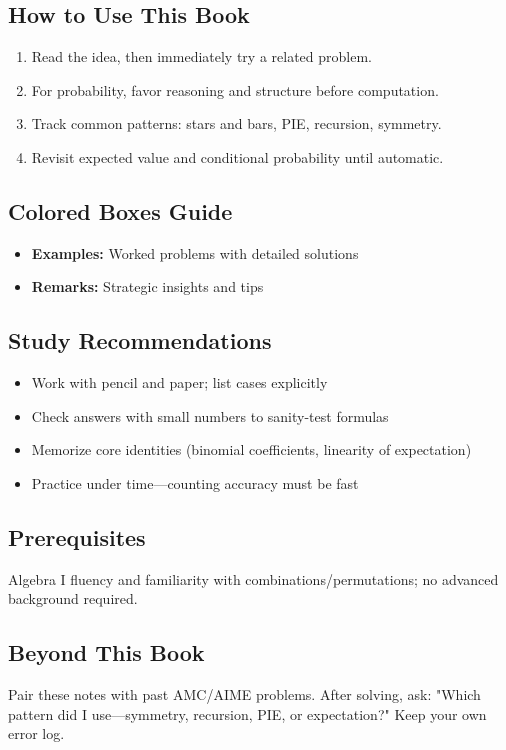 \documentclass[12pt]{extarticle}
\begin{document}
\subsection*{How to Use This Book}
\begin{enumerate}
    \item Read the idea, then immediately try a related problem.
    \item For probability, favor reasoning and structure before computation.
    \item Track common patterns: stars and bars, PIE, recursion, symmetry.
    \item Revisit expected value and conditional probability until automatic.
\end{enumerate}

\subsection*{Colored Boxes Guide}
\begin{itemize}
    \item \textcolor{blue!75!black}{\textbf{Examples:}} Worked problems with detailed solutions
    \item \textcolor{green!60!black}{\textbf{Remarks:}} Strategic insights and tips
\end{itemize}

\subsection*{Study Recommendations}
\begin{itemize}
    \item Work with pencil and paper; list cases explicitly
    \item Check answers with small numbers to sanity-test formulas
    \item Memorize core identities (binomial coefficients, linearity of expectation)
    \item Practice under time—counting accuracy must be fast
\end{itemize}

\subsection*{Prerequisites}
Algebra I fluency and familiarity with combinations/permutations; no advanced background required.

\subsection*{Beyond This Book}
Pair these notes with past AMC/AIME problems. After solving, ask: "Which pattern did I use—symmetry, recursion, PIE, or expectation?" Keep your own error log.
\end{document}

